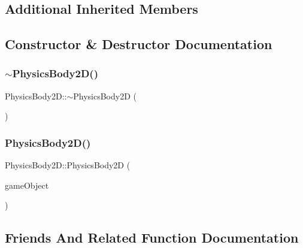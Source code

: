 \subsection*{Additional Inherited Members}


\subsection{Constructor \& Destructor Documentation}
\hypertarget{class_mason_1_1_physics_body2_d_a9cd23100f41c0ae3dbce853e88f804e1}{}\label{class_mason_1_1_physics_body2_d_a9cd23100f41c0ae3dbce853e88f804e1} 
\subsubsection{\texorpdfstring{$\sim$\+Physics\+Body2\+D()}{~PhysicsBody2D()}}
{\footnotesize\ttfamily Physics\+Body2\+D\+::$\sim$\+Physics\+Body2D (\begin{DoxyParamCaption}{ }\end{DoxyParamCaption})}

\hypertarget{class_mason_1_1_physics_body2_d_a4b6b50a1b3945ab0669bcdc0748b3d1c}{}\label{class_mason_1_1_physics_body2_d_a4b6b50a1b3945ab0669bcdc0748b3d1c} 
\subsubsection{\texorpdfstring{Physics\+Body2\+D()}{PhysicsBody2D()}}
{\footnotesize\ttfamily Physics\+Body2\+D\+::\+Physics\+Body2D (\begin{DoxyParamCaption}\item[{\hyperlink{class_mason_1_1_game_object}{Game\+Object} $\ast$}]{game\+Object }\end{DoxyParamCaption})\hspace{0.3cm}{\ttfamily [protected]}}



\subsection{Friends And Related Function Documentation}
\hypertarget{class_mason_1_1_physics_body2_d_a00df87c957d8f7ee0fc51f07a0542f4a}{}\label{class_mason_1_1_physics_body2_d_a00df87c957d8f7ee0fc51f07a0542f4a} 
